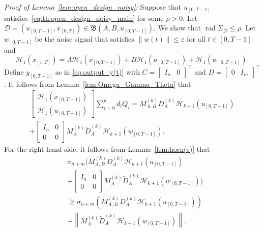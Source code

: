 \documentclass[journal,twoside,web]{ieeecolor}
\DeclareMathOperator{\rad}{rad}
\newcommand{\norm}[1]{\left\|#1\right\|}
\begin{document}
\textit{Proof of Lemma~\ref{lem:open_design_noisy}:} Suppose that $u_{[0,T-1]}$ satisfies~\eqref{eq:th:open_design_noisy_main} for some $\rho>0$. Let \mbox{$\mathcal{D}=(u_{[0,T-1]},x_{[0,T]})\in\mathfrak{B}(A,B,u_{[0,T-1]})$}. We show that \mbox{$\rad\Sigma_\mathcal{D}\leq\rho$}. Let $w_{[0,T-1]}$ be the noise signal that satisfies $\|w(t)\|\leq\varepsilon$ for all $t\in[0,T-1]$ and
\begin{equation}
\mathcal{H}_1(x_{[1,T]})\!=\!A\mathcal{H}_1(x_{[0,T-1]})+B\mathcal{H}_1(u_{[0,T-1]})+\mathcal{H}_1(w_{[0,T-1]}).
\end{equation}
Define $y_{[0,T-1]}$ as in \eqref{eq:output_y(t)} with $C=\begin{bmatrix}
I_n & 0
\end{bmatrix}^{\top}$ and \mbox{$D=\begin{bmatrix}
0 & I_m
\end{bmatrix}^{\top}$}. It follows from Lemma~\ref{lem:Omega_Gamma_Theta} that
\begin{equation}
\label{eq:lem:open_design_noisy_pf-4}
\begin{split}
\begin{bmatrix}
\mathcal{H}_{1}(x_{[0,T-1]}) \\ \mathcal{H}_{1}(u_{[0,T-1]})
\end{bmatrix}\sum_{i=0}^{k}d_iQ_i=M_{A,B}^{(k)}D_A^{(k)}\mathcal{H}_{k+1}(u_{[0,T-1]})\\
+\begin{bmatrix}
I_n & 0 \\
0 & 0
\end{bmatrix}M_{A}^{(k)}\tilde{D}_A^{(k)}\mathcal{H}_{k+1}(w_{[0,T-1]}).
\end{split}
\end{equation}
For the right-hand side, it follows from Lemma~\ref{lem:horn(c)} that
\begin{equation}
\label{eq:lem:open_design_noisy_pf-4_RHS}
\begin{split}
&\sigma_{n+m}\bigg(M_{A,B}^{(k)}D_A^{(k)}\mathcal{H}_{k+1}(u_{[0,T-1]})\\
&+\begin{bmatrix}
I_n & 0 \\
0 & 0
\end{bmatrix}M_{A}^{(k)}\tilde{D}_A^{(k)}\mathcal{H}_{k+1}(w_{[0,T-1]})\bigg)\\
&\geq \sigma_{n+m}(M_{A,B}^{(k)}D_A^{(k)}\mathcal{H}_{k+1}(u_{[0,T-1]}))\\
&-\norm{M_{A}^{(k)}\tilde{D}_A^{(k)}\mathcal{H}_{k+1}(w_{[0,T-1]})}.
\end{split}
\end{equation}
\end{document}
